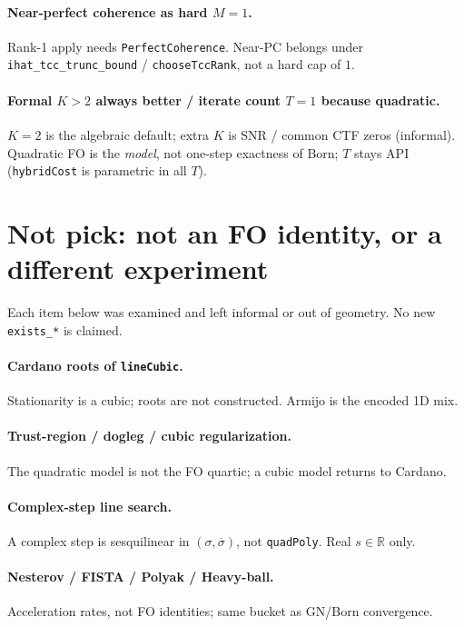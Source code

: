 \documentclass[11pt,a4paper]{article}
\theoremstyle{definition}
\theoremstyle{remark}
\newcommand{\R}{\mathbb{R}}
\newcommand{\conj}[1]{\overline{#1}}
\begin{document}
\paragraph{Near-perfect coherence as hard $M=1$.}
Rank-1 apply needs \texttt{PerfectCoherence}.
Near-PC belongs under \texttt{ihat\_tcc\_trunc\_bound} /
\texttt{chooseTccRank}, not a hard cap of $1$.

\paragraph{Formal $K>2$ always better / iterate count $T=1$ because quadratic.}
$K=2$ is the algebraic default; extra $K$ is SNR / common CTF zeros
(informal).
Quadratic FO is the \emph{model}, not one-step exactness of Born;
$T$ stays API (\texttt{hybridCost} is parametric in all $T$).

\section{Not pick: not an FO identity, or a different experiment}
\label{sec:informal}

Each item below was examined and left informal or out of geometry.
No new \texttt{exists\_*} is claimed.

\paragraph{Cardano roots of \texttt{lineCubic}.}
Stationarity is a cubic; roots are not constructed.
Armijo is the encoded 1D mix.

\paragraph{Trust-region / dogleg / cubic regularization.}
The quadratic model is not the FO quartic; a cubic model returns to
Cardano.

\paragraph{Complex-step line search.}
A complex step is sesquilinear in $(\sigma,\conj{\sigma})$, not
\texttt{quadPoly}. Real $s\in\R$ only.

\paragraph{Nesterov / FISTA / Polyak / Heavy-ball.}
Acceleration rates, not FO identities; same bucket as GN/Born
convergence.
\end{document}
